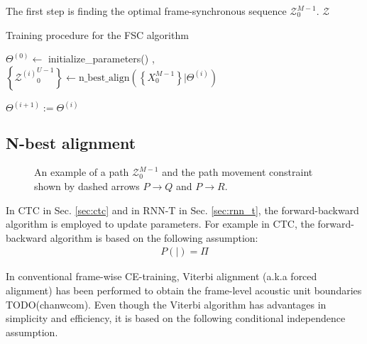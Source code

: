 \documentclass{article}
\begin{document}
The first step is finding the optimal frame-synchronous sequence
$\mathcal{Z}_0^{M-1}$.   
$\mathcal{Z}$


\begin{algorithm}
  \caption{Training procedure for the FSC algorithm}
  \label{algo:fsc_training}
  \begin{algorithmic}
    \State $\Theta^{(0)} \leftarrow$ initialize\_parameters()
      , 
        \State $\left\{ {{\mathcal{Z}^{(i)}}_0^{U-1}} \right\}
          \leftarrow
          \text{n\_best\_align}
          \left(
            \left\{X_{0}^{M-1} \right\} \Big| \Theta^{(i)}
          \right)$


    \EndFor
    \State $\Theta^{(i+1)} := \Theta^{(i)}$
  \EndFor
  \label{algorithm:fsc_training}
  \end{algorithmic}
\end{algorithm}



\subsection{N-best alignment}
\label{sec:n_best_alignment}


\begin{figure}
  \centering
    \resizebox{100mm}{!}{
      
    } 
    \caption {
      An example of a path $\mathcal{Z}_{0}^{M-1}$ and the path movement 
      constraint shown by dashed arrows $P \rightarrow Q$ and $P \rightarrow R$. 
      \label{fig:path_alignment}
    }
\end{figure}

In CTC in Sec. \ref{sec:ctc} and in RNN-T in Sec. \ref{sec:rnn_t}, the 
forward-backward algorithm is employed to update parameters. 
For example in CTC, the forward-backward algorithm is based on the
following assumption:
\begin{align}
  P \left(  \Big| \right) = \Pi
\end{align}

In conventional frame-wise CE-training, Viterbi alignment 
(a.k.a forced alignment) has been performed to obtain the frame-level 
acoustic unit  boundaries TODO(chanwcom). Even though the Viterbi algorithm
has advantages in simplicity and efficiency, it is based on
the following conditional independence assumption.
\end{document}
